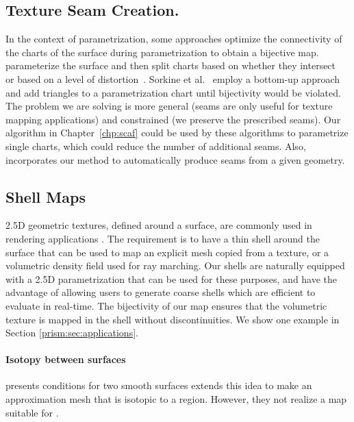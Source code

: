 \subsection*{Texture Seam Creation.}
In the context of parametrization, some approaches optimize the connectivity of the charts of the surface during parametrization to obtain a bijective map.  \cite{Levy:2002,Zhou:2004} parameterize the surface and then split charts based on whether they intersect~\cite{Levy:2002} or based on a level of distortion~\cite{Zhou:2004}.  Sorkine et al.~\cite{Sorkine:2002} employ a bottom-up approach and add triangles to a parametrization chart until bijectivity would be violated. The problem we are solving is more general (seams are only useful for texture mapping applications) and constrained (we preserve the prescribed seams). Our algorithm in Chapter~\ref{chp:scaf} could be used by these algorithms to parametrize single charts, which could reduce the number of additional seams. Also, \cite{li2018optcuts} incorporates our method to automatically produce seams from a given geometry.

\subsection*{Shell Maps}
2.5D geometric textures, defined around a surface, are commonly used in rendering applications \cite{wang2003view,wang2004generalized,porumbescu2005shell,peng2004interactive,lengyel2001real,chen2004shell,huang2007gradient,jin2019shell}. The requirement is to have a thin shell around the surface that can be used to map an explicit mesh copied from a texture, or a volumetric density field used for ray marching. Our shells are naturally equipped with a 2.5D parametrization that can be used for these purposes, and have the advantage of allowing users to  generate coarse shells which are efficient to evaluate in real-time. The bijectivity of our map ensures that the  volumetric texture is mapped in the shell without discontinuities. We show one example in Section \ref{prism:sec:applications}.

\paragraph{Isotopy between surfaces}
 presents conditions for two  smooth surfaces  \cite{mandad2015isotopic} extends this idea to make an approximation mesh that is isotopic to a region. However, they  not realize a map suitable for .

